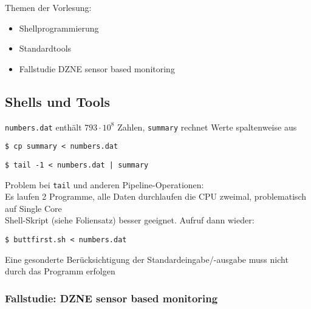 

	Themen der Vorlesung:
	\begin{itemize}
		\item Shellprogrammierung
		\item Standardtools
		\item Fallstudie DZNE sensor based monitoring
	\end{itemize}

	\subsection{Shells und Tools} %
	\label{sub:shells_und_tools}

		\texttt{numbers.dat} enthält $793\cdot10^8$ Zahlen, \texttt{summary} rechnet Werte
		spaltenweise aus

		
		\begin{lstlisting}
$ cp summary < numbers.dat
		\end{lstlisting}

		\begin{lstlisting}
$ tail -1 < numbers.dat | summary
		\end{lstlisting}

		Problem bei \texttt{tail} und anderen Pipeline-Operationen:\\
		Es laufen 2 Programme,  alle Daten durchlaufen die CPU zweimal, problematisch auf
		Single Core\\

		Shell-Skript (siehe Foliensatz) besser geeignet. Aufruf dann wieder:

		\lstShell
		\begin{lstlisting}
$ buttfirst.sh < numbers.dat
		\end{lstlisting}

		Eine gesonderte Berücksichtigung der Standardeingabe/-ausgabe muss nicht durch das
		Programm erfolgen

		\subsubsection*{Fallstudie: DZNE sensor based monitoring} %
		\label{ssub:fallstudie_dzne_sensor_based_monitoring}
	

